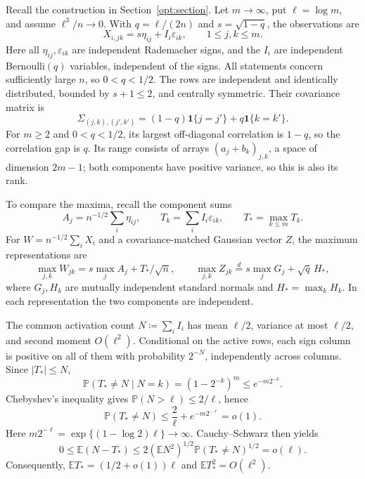 \documentclass[11pt,letterpaper]{article}
\theoremstyle{remark}
\newcommand{\E}{\mathbb E}
\newcommand{\Pp}{\mathbb P}
\newcommand{\ind}{\mathbf 1}
\begin{document}
Recall the construction in Section~\ref{opt:section}. Let
\(m\to\infty\), put \(\ell=\log m\), and assume \(\ell^3/n\to0\).
With \(q=\ell/(2n)\) and \(s=\sqrt{1-q}\), the observations are
\[
 X_{i,jk}=s\eta_{ij}+I_i\varepsilon_{ik},\qquad 1\le j,k\le m.
\]
Here all \(\eta_{ij},\varepsilon_{ik}\) are independent Rademacher
signs, and the \(I_i\) are independent Bernoulli\((q)\) variables,
independent of the signs. All statements concern sufficiently large
\(n\), so \(0<q<1/2\).
The rows are independent and identically distributed, bounded by
\(s+1\le2\), and centrally symmetric. Their covariance matrix is
\[
 \Sigma_{(j,k),(j',k')}=(1-q)\ind\{j=j'\}+q\ind\{k=k'\}.
\]
For \(m\ge2\) and \(0<q<1/2\), its largest off-diagonal correlation
is \(1-q\), so the correlation gap is \(q\).
Its range consists of arrays \((a_j+b_k)_{j,k}\), a space of
dimension \(2m-1\); both components have positive variance, so this
is also its rank.

To compare the maxima, recall the component sums
\[
 A_j=n^{-1/2}\sum_i\eta_{ij},\qquad
 T_k=\sum_i I_i\varepsilon_{ik},\qquad T_*=\max_{k\le m}T_k.
\]
For \(W=n^{-1/2}\sum_iX_i\) and a covariance-matched Gaussian
vector \(Z\), the maximum representations are
\[
 \max_{j,k}W_{jk}=s\max_jA_j+T_*/\sqrt n,\qquad
 \max_{j,k}Z_{jk}\stackrel d=s\max_jG_j+\sqrt q\,H_*,
\]
where \(G_j,H_k\) are mutually independent standard normals and
\(H_*=\max_kH_k\). In each representation the two components are
independent.

The common activation count \(N\coloneqq\sum_iI_i\) has mean
\(\ell/2\), variance at most \(\ell/2\), and second moment
\(O(\ell^2)\). Conditional on the active rows, each sign column is
positive on all of them with probability \(2^{-N}\), independently
across columns. Since \(|T_*|\le N\),
\[
 \Pp(T_*\ne N\mid N=k)=(1-2^{-k})^m\le e^{-m2^{-k}}.
\]
Chebyshev's inequality gives \(\Pp(N>\ell)\le2/\ell\), hence
\[
 \Pp(T_*\ne N)\le\frac2\ell+e^{-m2^{-\ell}}=o(1).
\]
Here \(m2^{-\ell}=\exp\{(1-\log2)\ell\}\to\infty\).
Cauchy--Schwarz then yields
\[
 0\le\E(N-T_*)\le2(\E N^2)^{1/2}
                         \Pp(T_*\ne N)^{1/2}=o(\ell).
\]
Consequently, \(\E T_*=(1/2+o(1))\ell\) and
\(\E T_*^2=O(\ell^2)\).
\end{document}
